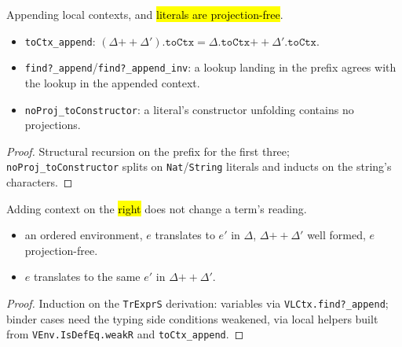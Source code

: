\begin{lemma}
  \label{prim-cond:family:vlctx-append}
  \leanok

   Appending local contexts, and \hl{literals are projection-free}.
  \begin{itemize}
  \item \texttt{toCtx\_append}: $(\Delta \mathbin{+\!\!+} \Delta').\mathtt{toCtx} =
    \Delta.\mathtt{toCtx} \mathbin{+\!\!+} \Delta'.\mathtt{toCtx}$.
  \item \texttt{find?\_append}/\texttt{find?\_append\_inv}: a lookup landing in the prefix agrees
    with the lookup in the appended context.
  \item \texttt{noProj\_toConstructor}: a literal's constructor unfolding contains no projections.
  \end{itemize}
\end{lemma}
\begin{proof}
  \leanok
   Structural recursion on the prefix for the first three; \texttt{noProj\_toConstructor}
  splits on \texttt{Nat}/\texttt{String} literals and inducts on the string's characters.
\end{proof}

\begin{lemma}
  \label{prim-cond:thm:trexprs-weakr}
  \leanok

   Adding context on the \hl{right} does not change a term's reading.
  \begin{itemize}
  \item {} an ordered environment, $e$ translates to $e'$ in $\Delta$, $\Delta
    \mathbin{+\!\!+} \Delta'$ well formed, $e$ projection-free.
  \item {} $e$ translates to the same $e'$ in $\Delta \mathbin{+\!\!+} \Delta'$.
  \end{itemize}
\end{lemma}
\begin{proof}
  \leanok
   Induction on the \texttt{TrExprS} derivation: variables via
  \texttt{VLCtx.find?\_append}; binder cases need the typing side conditions weakened, via local
  helpers built from \texttt{VEnv.IsDefEq.weakR} and \texttt{toCtx\_append}.
\end{proof}

